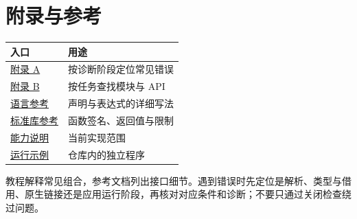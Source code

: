 \section*{附录与参考}

\begin{center}
\begin{tabular}{ll}
\toprule
入口 & 用途 \\
\midrule
\hyperref[ch:appA]{附录 A} & 按诊断阶段定位常见错误 \\
\hyperref[ch:appB]{附录 B} & 按任务查找模块与 API \\
\href{https://github.com/rabbitc999/ChaLi/blob/master/doc/04-language-reference.md}{语言参考} & 声明与表达式的详细写法 \\
\href{https://github.com/rabbitc999/ChaLi/blob/master/doc/library/README.md}{标准库参考} & 函数签名、返回值与限制 \\
\href{https://github.com/rabbitc999/ChaLi/blob/master/doc/17-capabilities.md}{能力说明} & 当前实现范围 \\
\href{https://github.com/rabbitc999/ChaLi/tree/master/example/samples}{运行示例} & 仓库内的独立程序 \\
\bottomrule
\end{tabular}
\end{center}

教程解释常见组合，参考文档列出接口细节。遇到错误时先定位是解析、类型与借用、原生链接还是应用运行阶段，再核对对应条件和诊断；不要只通过关闭检查绕过问题。
